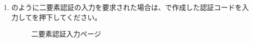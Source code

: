 \begin{enumerate}
                \newpage
                \item {}のように二要素認証の入力を要求された場合は、で作成した認証コードを入力してを押下してください。
                    \begin{figure}[htbp]
                        \centering
                        \caption{二要素認証入力ページ}
                        \label{img:misskey4}
                    \end{figure}


\end{enumerate}
